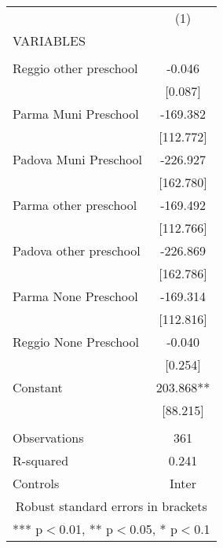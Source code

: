 \begin{tabular}{lc} \hline
 & (1) \\
VARIABLES &  \\ \hline
 &  \\
Reggio other preschool & -0.046 \\
 & [0.087] \\
Parma Muni Preschool & -169.382 \\
 & [112.772] \\
Padova Muni Preschool & -226.927 \\
 & [162.780] \\
Parma other preschool & -169.492 \\
 & [112.766] \\
Padova other preschool & -226.869 \\
 & [162.786] \\
Parma None Preschool & -169.314 \\
 & [112.816] \\
Reggio None Preschool & -0.040 \\
 & [0.254] \\
Constant & 203.868** \\
 & [88.215] \\
 &  \\
Observations & 361 \\
R-squared & 0.241 \\
 Controls & Inter \\ \hline
\multicolumn{2}{c}{ Robust standard errors in brackets} \\
\multicolumn{2}{c}{ *** p$<$0.01, ** p$<$0.05, * p$<$0.1} \\
\end{tabular}
